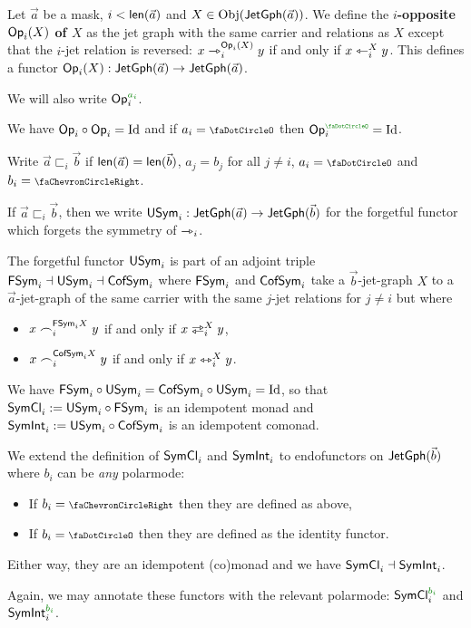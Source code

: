 \documentclass[a4paper]{memoir}
\begin{document}
\begin{definition} \label{def:op}
	Let $\vec a$ be a mask, $i < \mathsf{len}(\vec a)$ and $X \in \mathrm{Obj}(\mathsf{JetGph}(\vec a))$.
	We define the \textbf{$i$-opposite ${\mathsf{Op}}_i(X)$ of $X$} as the jet graph with the same carrier and relations as $X$ except that the $i$-jet relation is reversed: $x \rightarrowtriangle_i^{{\mathsf{Op}}_i(X)} y$ if and only if $x \leftarrowtriangle_i^X y$.
	This defines a functor ${\mathsf{Op}}_i(X) : \mathsf{JetGph}(\vec a) \to \mathsf{JetGph}(\vec a)$.
	
	We will also write $\Op_i\pmr{a_i}$.
\end{definition}
We have ${\mathsf{Op}}_i \circ {\mathsf{Op}}_i = \mathrm{Id}$ and if $a_i = \npolar$ then $\Op_i\pmr\npolar = \Id$.
\begin{definition}
	\label{def:sym-forget}
	\label{def:polarmode-order-step}
	Write $\vec a \sqsubset_i \vec b$ if $\mathsf{len}(\vec a) = \mathsf{len}(\vec b)$, $a_j = b_j$ for all $j \neq i$, $a_i = \npolar$ and $b_i = \ypolar$.
	
	If $\vec a \sqsubset_i \vec b$, then we write $\mathsf{USym}_i : \mathsf{JetGph}(\vec a) \to \mathsf{JetGph}(\vec b)$ for the forgetful functor which forgets the symmetry of $\rightarrowtriangle_i$.
\end{definition}
\begin{proposition} \label{def:sym-free} \label{def:sym-cofree}
	The forgetful functor $\mathsf{USym}_i$ is part of an adjoint triple $\mathsf{FSym}_i \dashv \mathsf{USym}_i \dashv \mathsf{CofSym}_i$ where $\mathsf{FSym}_i$ and $\mathsf{CofSym}_i$ take a $\vec b$-jet-graph $X$ to a $\vec a$-jet-graph of the same carrier with the same $j$-jet relations for $j \neq i$ but where
	\begin{itemize}
		\item $x \frown_i^{\mathsf{FSym}_i X} y$ if and only if $x \infrajet_i^X y$,
		\item $x \frown_i^{\mathsf{CofSym}_i X} y$ if and only if $x \leftrightarrowtriangle_i^X y$.
	\end{itemize}
	We have $\mathsf{FSym}_i \circ \mathsf{USym}_i = \mathsf{CofSym}_i \circ \mathsf{USym}_i = \mathrm{Id}$, so that $\mathsf{SymCl}_i := \mathsf{USym}_i \circ \mathsf{FSym}_i$ is an idempotent monad and $\mathsf{SymInt}_i := \mathsf{USym}_i \circ \mathsf{CofSym}_i$ is an idempotent comonad.
\end{proposition}
\begin{definition} \label{def:sym-closure-of-sym}
	We extend the definition of $\mathsf{SymCl}_i$ and $\mathsf{SymInt}_i$ to endofunctors on $\mathsf{JetGph}(\vec b)$ where $b_i$ can be \emph{any} polarmode:
	\begin{itemize}
		\item If $b_i = \ypolar$ then they are defined as above,
		\item If $b_i = \npolar$ then they are defined as the identity functor.
	\end{itemize}
	Either way, they are an idempotent (co)monad and we have $\mathsf{SymCl}_i \dashv \mathsf{SymInt}_i$.
	
	Again, we may annotate these functors with the relevant polarmode: $\UFsym_i\pmr{b_i}$ and $\UCsym_i\pmr{b_i}$.
\end{definition}
\end{document}
